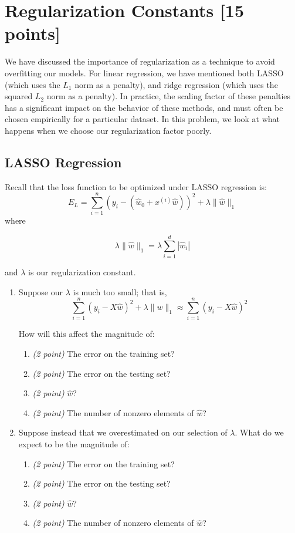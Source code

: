 \documentclass[letterpaper]{article}
\begin{document}
\section{Regularization Constants [15 points]}
We have discussed the importance of regularization as a technique to avoid overfitting our models. For linear regression, we have mentioned both LASSO (which uses the $L_1$ norm as a penalty), and ridge regression (which uses the squared $L_2$ norm as a penalty). In practice, the scaling factor of these penalties has a significant impact on the behavior of these methods, and must often be chosen empirically for a particular dataset. In this problem, we look at what happens when we choose our regularization factor poorly.

\subsection{LASSO Regression}

Recall that the loss function to be optimized under LASSO regression is:
\[
E_L = \sum_{i=1}^n(y_i - (\hat w_0 + x^{(i)}\hat{w}))^2 + \lambda \| \hat w \|_1
\]
where

\begin{equation} \label{eq:lassopenalty}
\lambda \| \hat w \|_1 = \lambda \sum_{i=1}^d |\hat w_i|
\end{equation}

and $\lambda$ is our regularization constant.

\smallskip
\noindent
\begin{enumerate}
\item Suppose our $\lambda$ is much too small; that is,
\[
\sum_{i=1}^n(y_i - X\hat{w})^2 + \lambda \| w \|_1 \approx \sum_{i=1}^n(y_i - X\hat{w})^2
\]

\noindent
How will this affect the magnitude of:
\begin{enumerate}
\item \emph{(2 point)}
The error on the training set?
\item \emph{(2 point)}
The error on the testing set?
\item \emph{(2 point)}
$\hat{w}$?
\item \emph{(2 point)}
The number of nonzero elements of $\hat{w}$?
\end{enumerate}

\noindent
\item Suppose instead that we overestimated on our selection of $\lambda$.
What do we expect to be the magnitude of:
\begin{enumerate}
\item \emph{(2 point)}
The error on the training set?
\item \emph{(2 point)}
The error on the testing set?
\item \emph{(2 point)}
$\hat{w}$?
\item \emph{(2 point)}
The number of nonzero elements of $\hat{w}$?
\end{enumerate}
\end{enumerate}
\end{document}
